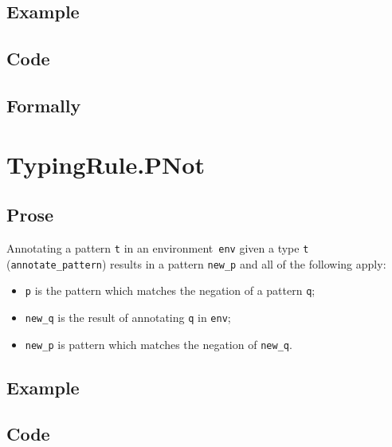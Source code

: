 \documentclass{book}
\begin{document}
  \subsection{Example}

  \subsection{Code}

\begin{emptyformal}
    \subsection{Formally}
\end{emptyformal}

 
\section{TypingRule.PNot \label{sec:TypingRule.PNot}}

  \subsection{Prose}
   Annotating a pattern \texttt{t} in an environment~\texttt{env} given a type \texttt{t} (\texttt{annotate\_pattern}) results in a pattern \texttt{new\_p} and all of the following apply:
   \begin{itemize}
   \item \texttt{p} is the pattern which matches the negation of a pattern \texttt{q};
   \item \texttt{new\_q} is the result of annotating \texttt{q} in \texttt{env}; 
   \item \texttt{new\_p} is pattern which matches the negation of \texttt{new\_q}.
   \end{itemize}

  \subsection{Example}

  \subsection{Code}
\end{document}
